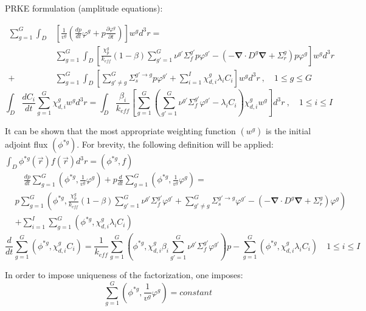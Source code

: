 \documentclass[10pt]{scrartcl}
\renewcommand{\div}{\bs{\nabla}\! \cdot \!}
\newcommand{\grad}{\bs{\nabla}}
\newcommand{\bs}[1]{\mathbf{#1}}
\newcommand{\be}{\begin{equation}}
\newcommand{\ee}{\end{equation}}
\begin{document}
PRKE formulation (amplitude equations):

\begin{align}
\sum_{g=1}^G\int_D &\left[\frac{1}{v^g}\left(\frac{dp}{dt}\varphi^g + p\frac{\partial \varphi^g}{\partial t}\right)\right]w^gd^3r =  \nonumber \\
& \sum_{g=1}^G\int_D\left[\frac{\chi_p^g}{k_{eff}} (1-\beta)\sum_{g'=1}^G  \nu^{g'} \Sigma_f^{g'} p \varphi^{g'} - \left( -\div D^g \grad  + \Sigma_r^g \right)p \varphi^g\right]w^gd^3r   \\ 
 +&\sum_{g=1}^G\int_D \left[\sum_{g'\neq g}^G\Sigma_s^{g'\to g} p \varphi^{g'}  + \sum_{i=1}^I\chi_{d,i}^g\lambda_i C_i\right]w^gd^3r \ , \quad 1 \le g \le G  \nonumber
\end{align}
\be 
\int_D\frac{dC_i}{dt}\sum_{g=1}^G\chi_{d,i}^gw^gd^3r = \int_D \frac{\beta_i}{k_{eff}}\left[\sum_{g=1}^G\left(\sum_{g'=1}^G\nu^{g'} \Sigma_f^{g' }\varphi^{g'} - \lambda_i C_i \right)\chi_{d,i}^g w^g\right]d^3r \ , \quad 1 \le i \le I 
\ee

It can be shown that the most appropriate weighting function $(w^g)$ is the initial adjoint flux $(\phi^{*g})$.  For brevity, the following definition will be applied: $\int_D\phi^{*g}(\vec{r})f(\vec{r})d^3r=\left(\phi^{*g},f\right)$
\begin{align}
& \quad \frac{dp}{dt}\sum_{g=1}^G\left(\phi^{*g},\frac{1}{v^g}\varphi^g\right)+ p\frac{d}{dt}\sum_{g=1}^G\left(\phi^{*g},\frac{1}{v^g}\varphi^g\right)= \nonumber \\
& p\sum_{g=1}^G\left(\phi^{*g},\frac{\chi_p^g}{k_{eff}}(1-\beta) \sum_{g'=1}^G  \nu^{g'} \Sigma_f^{g'} \varphi^{g'} + \sum_{g'\neq g}^G\Sigma_s^{g'\to g} \varphi^{g'} - \left( -\div D^g \grad  + \Sigma_r^g \right) \varphi^g\right)  \\
& + \sum_{i=1}^I\sum_{g=1}^G(\phi^{*g},\chi_{d,i}^g\lambda_i C_i) \nonumber
\end{align}
\be
\frac{d}{dt}\sum_{g=1}^G(\phi^{*g},\chi_{d,i}^gC_i)=\frac{1}{k_{eff}}\sum_{g=1}^G(\phi^{*g},\chi_{d,i}^g\beta_i\sum_{g'=1}^G\nu^{g'} \Sigma_f^{g' }\varphi^{g'})p - \sum_{g=1}^G(\phi^{*g},\chi_{d,i}^g\lambda_iC_i) \quad 1 \le i \le I 
\ee

In order to impose uniqueness of the factorization, one imposes:
\be
\sum_{g=1}^G\left(\phi^{*g},\frac{1}{v^g}\varphi^g\right)=constant
\ee
\end{document}
